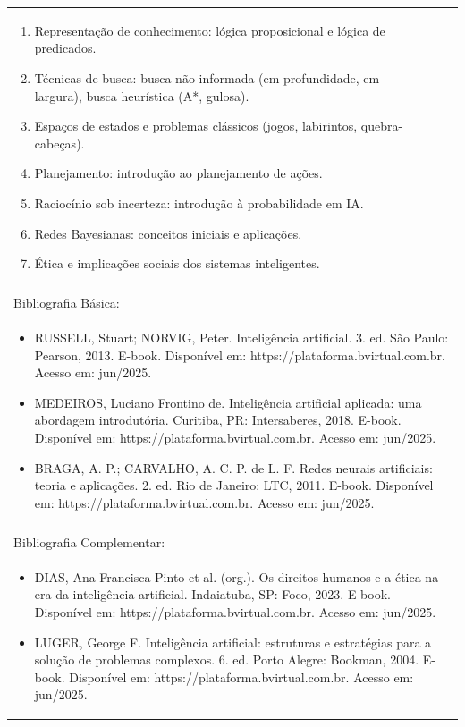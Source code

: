 \documentclass[11pt]{article}
\begin{document}
\begin{center}
\begin{longtable}{|p{4cm}|p{4cm}|p{4cm}|p{4cm}|}
{\begin{enumerate}
\item Representação de conhecimento: lógica proposicional e lógica de predicados.
\item Técnicas de busca: busca não-informada (em profundidade, em largura), busca heurística (A*, gulosa).
\item Espaços de estados e problemas clássicos (jogos, labirintos, quebra-cabeças).
\item Planejamento: introdução ao planejamento de ações.
\item Raciocínio sob incerteza: introdução à probabilidade em IA.
\item Redes Bayesianas: conceitos iniciais e aplicações.
\item Ética e implicações sociais dos sistemas inteligentes.\end{enumerate}}\\
\multicolumn{4}{|p{16cm}|}{}\\
\hline
\multicolumn{4}{|p{16cm}|}{Bibliografia Básica:}\\
\multicolumn{4}{|p{\dimexpr 16cm + 6\tabcolsep\relax}|}{%
\begin{itemize}\item RUSSELL, Stuart; NORVIG, Peter. Inteligência artificial. 3. ed. São Paulo: Pearson, 2013. E-book. Disponível em: https://plataforma.bvirtual.com.br. Acesso em: jun/2025.
\item MEDEIROS, Luciano Frontino de. Inteligência artificial aplicada: uma abordagem introdutória. Curitiba, PR: Intersaberes, 2018. E-book. Disponível em: https://plataforma.bvirtual.com.br. Acesso em: jun/2025.
\item BRAGA, A. P.; CARVALHO, A. C. P. de L. F. Redes neurais artificiais: teoria e aplicações. 2. ed. Rio de Janeiro: LTC, 2011. E-book. Disponível em: https://plataforma.bvirtual.com.br. Acesso em: jun/2025.\end{itemize}}\\
\multicolumn{4}{|p{16cm}|}{}\\
\hline
\multicolumn{4}{|p{16cm}|}{Bibliografia Complementar:}\\
\multicolumn{4}{|p{\dimexpr 16cm + 6\tabcolsep\relax}|}{%
\begin{itemize}\item DIAS, Ana Francisca Pinto et al. (org.). Os direitos humanos e a ética na era da inteligência artificial. Indaiatuba, SP: Foco, 2023. E-book. Disponível em: https://plataforma.bvirtual.com.br. Acesso em: jun/2025.
\item LUGER, George F. Inteligência artificial: estruturas e estratégias para a solução de problemas complexos. 6. ed. Porto Alegre: Bookman, 2004. E-book. Disponível em: https://plataforma.bvirtual.com.br. Acesso em: jun/2025.

\end{itemize}}
\end{longtable}
\end{center}
\end{document}
